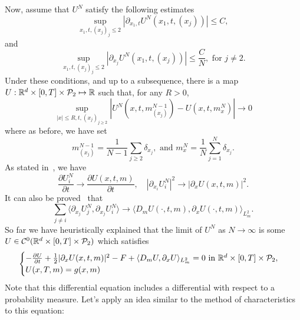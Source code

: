 Now, assume that $U^N$ satisfy the following estimates
\begin{equation}
    \sup_{x_1, t, (x_j)_j \leq 2} \left| \partial_{x_1, t} U^N (x_1, t, (x_j)) \right| \leq C,
\end{equation}
and
\begin{equation}
    \sup_{x_1, t, (x_j)_j \leq 2} \left| \partial_{x_j} U^N (x_1, t, (x_j)) \right| \leq  \frac{C}{N}, \text{ for } j\neq 2.
\end{equation}
Under these conditions, and up to a subsequence, there is a map 
$U : \mathbb{R}^d \times [0,T] \times \mathcal{P}_2 \mapsto \mathbb{R}$ such that,
for any $R > 0$,
\begin{equation}
    \sup_{|x| \leq R, t, (x_j)_{j\geq 2}} | U^N(x,t,m^{N-1}_{(x_j)}) - U(x,t,m^N_x) | \to 0
\end{equation}
where as before, we have set
\begin{equation}
    m^{N-1}_{(x_j)} = \frac{1}{N-1} \sum_{j \geq 2} \delta_{x_j}, \text{ and } m^N_x = \frac{1}{N} \sum_{j = 1}^N \delta_{x_j}.
\end{equation}
As stated in~\cite{cardaliaguet2010notes}, we have
\begin{equation}
    \frac{\partial U^N_i}{\partial t} \to \frac{\partial U(x,t,m)}{\partial t}, \quad |\partial_{x_i} U_i^N|^2 \to |\partial_x U (x,t,m)|^2.
\end{equation}
It can also be proved~\cite{cardaliaguet2010notes} that
\begin{equation}
    \sum_{j\neq i} \langle \partial_{x_j} U^N_j , \partial_{x_j} U^N_i \rangle \to \langle D_m U(\cdot,t,m), \partial_x U(\cdot, t, m) \rangle_{L^2_m}.
\end{equation}
So far we have heuristically explained that the limit of $U^N$ as $N \to \infty$
is some $U\in \mathcal{C}^0(\mathbb{R}^d \times [0,T] \times \mathcal{P}_2) $
 which satisfies 
 \begin{equation}\label{wass:simple_master_equation}
    \begin{cases}
        - \frac{\partial U}{ \partial t} + \frac{1}{2} |\partial_x U(x,t,m)|^2 - F + \langle D_m U, \partial_x U \rangle_{L^2_m} = 0\text{ in }\mathbb{R}^d \times [0,T] \times \mathcal{P}_2,\\
        U(x,T,m) = g(x,m)
    \end{cases}
 \end{equation}
 Note that this differential equation includes a differential with respect to
 a probability measure.
  Let's apply an idea similar to the method of characteristics to this equation:
